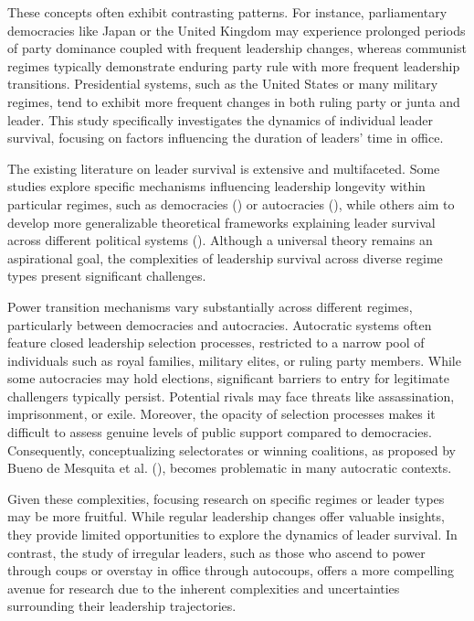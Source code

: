 \documentclass[
  12pt,
]{report}
\begin{document}
These concepts often exhibit contrasting patterns. For instance,
parliamentary democracies like Japan or the United Kingdom may
experience prolonged periods of party dominance coupled with frequent
leadership changes, whereas communist regimes typically demonstrate
enduring party rule with more frequent leadership transitions.
Presidential systems, such as the United States or many military
regimes, tend to exhibit more frequent changes in both ruling party or
junta and leader. This study specifically investigates the dynamics of
individual leader survival, focusing on factors influencing the duration
of leaders' time in office.

The existing literature on leader survival is extensive and
multifaceted. Some studies explore specific mechanisms influencing
leadership longevity within particular regimes, such as democracies
() or autocracies
(), while others aim to develop more generalizable theoretical
frameworks explaining leader survival across different political systems
().
Although a universal theory remains an aspirational goal, the
complexities of leadership survival across diverse regime types present
significant challenges.

Power transition mechanisms vary substantially across different regimes,
particularly between democracies and autocracies. Autocratic systems
often feature closed leadership selection processes, restricted to a
narrow pool of individuals such as royal families, military elites, or
ruling party members. While some autocracies may hold elections,
significant barriers to entry for legitimate challengers typically
persist. Potential rivals may face threats like assassination,
imprisonment, or exile. Moreover, the opacity of selection processes
makes it difficult to assess genuine levels of public support compared
to democracies. Consequently, conceptualizing selectorates or winning
coalitions, as proposed by Bueno de Mesquita et al.
(), becomes problematic in many
autocratic contexts.

Given these complexities, focusing research on specific regimes or
leader types may be more fruitful. While regular leadership changes
offer valuable insights, they provide limited opportunities to explore
the dynamics of leader survival. In contrast, the study of irregular
leaders, such as those who ascend to power through coups or overstay in
office through autocoups, offers a more compelling avenue for research
due to the inherent complexities and uncertainties surrounding their
leadership trajectories.
\end{document}
